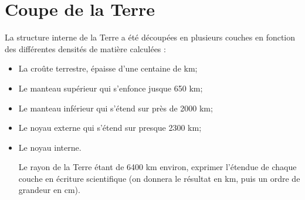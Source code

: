 \documentclass[a4paper,11pt]{exam}
\begin{document}
\section{Coupe de la Terre}	
	La structure interne de la Terre a été découpées en plusieurs couches en fonction des différentes densités de matière calculées :
	\begin{itemize}
		\item La croûte terrestre, épaisse d'une centaine de km;
		\item Le manteau supérieur qui s'enfonce jusque 650 km;
		\item Le manteau inférieur qui s'étend sur près de \num{2000} km;
		\item Le noyau externe qui s'étend sur presque \num{2300} km;
		\item Le noyau interne.
		
		\begin{questions}
			\question Le rayon de la Terre étant de \num{6400} km environ, exprimer l'étendue de chaque couche en écriture scientifique (on donnera le résultat en km, puis un ordre de grandeur en cm).
		\end{questions}
	\end{itemize}
	\label{LastPage}
\end{document}
